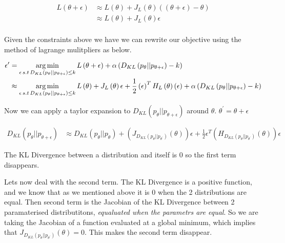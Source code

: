 \documentclass[12pt, a4paper]{report}
\theoremstyle{definition}
\theoremstyle{definition}
\theoremstyle{definition}
\begin{document}
\begin{align*}
L\left(\theta + \epsilon\right) &\approx L\left( \theta \right) + J_L \left( \theta\right) \left( \left( \theta + \epsilon \right) - \theta \right)  \\
&\approx L\left( \theta \right) +  J_L \left( \theta\right) \epsilon \\
\end{align*}

Given the constraints above we have we can rewrite our objective using the method of lagrange mulitpliers as below.

\begin{align}
    \epsilon^\prime &= \operatorname*{arg\,min}_{\epsilon \, s.t \, D_{KL} \left(p_\theta || p_{\theta + \epsilon} \right) \leq k} L \left( \theta + \epsilon \right) + \alpha \left( D_{KL} \left(p_\theta || p_{\theta + \epsilon} \right) - k\right) \\
    &\approx \operatorname*{arg\,min}_{\epsilon \, s.t \, D_{KL} \left(p_\theta || p_{\theta + \epsilon} \right) \leq k}  L\left( \theta \right) +  J_L \left( \theta\right) \epsilon  + \frac{1}{2} \left(\epsilon \right)^T H_L \left(\theta \right) \left( \epsilon\right) + \alpha \left( D_{KL} \left(p_\theta || p_{\theta + \epsilon} \right) - k\right) \\
\end{align}

Now we can apply a taylor expansion to $D_{KL} \left(p_\theta || p_{\theta + \epsilon} \right)$ around $\theta$. $\theta^\prime = \theta + \epsilon$


\begin{align}
    D_{KL} \left(p_\theta || p_{\theta + \epsilon} \right) &\approx  D_{KL} \left(p_\theta || p_{\theta} \right) + \left(J_{D_{KL} \left(p_\theta || p_{\theta^\prime} \right)}\left( \theta \right) \right) \epsilon + \frac{1}{2} \epsilon^T \left( H_{D_{KL} \left(p_\theta || p_{\theta^\prime} \right)}\left( \theta \right) \right) \epsilon
\end{align}

The KL Divergence between a distribution and itself is $0$ so the first term disappears.


Lets now deal with the second term. The KL Divergence is a positive function, and we know that as we mentioned above it is $0$ when the 2 distributions are equal. Then second term is the Jacobian of the KL Divergence between 2 paramaterised distributitons, \textit{equaluated when the parametrs are equal}. So we are taking the Jacobian of a function evaluated at a global minimum, which implies that $J_{D_{KL} \left(p_\theta || p_{\theta^\prime} \right)}\left( \theta \right)  = 0$. This makes the second term disappear.
\end{document}
